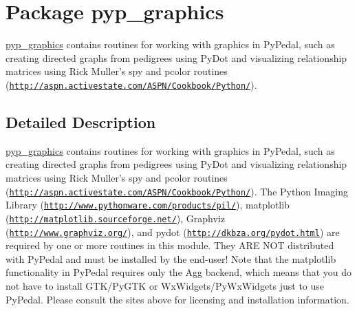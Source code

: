 \hypertarget{namespacepyp__graphics}{
\section{Package pyp\_\-graphics}
\label{namespacepyp__graphics}
}


\hyperlink{namespacepyp__graphics}{pyp\_\-graphics} contains routines for working with graphics in PyPedal, such as creating directed graphs from pedigrees using PyDot and visualizing relationship matrices using Rick Muller's spy and pcolor routines (\href{http://aspn.activestate.com/ASPN/Cookbook/Python/}{\tt http://aspn.activestate.com/ASPN/Cookbook/Python/}).  




\subsection{Detailed Description}
\hyperlink{namespacepyp__graphics}{pyp\_\-graphics} contains routines for working with graphics in PyPedal, such as creating directed graphs from pedigrees using PyDot and visualizing relationship matrices using Rick Muller's spy and pcolor routines (\href{http://aspn.activestate.com/ASPN/Cookbook/Python/}{\tt http://aspn.activestate.com/ASPN/Cookbook/Python/}). The Python Imaging Library (\href{http://www.pythonware.com/products/pil/}{\tt http://www.pythonware.com/products/pil/}), matplotlib (\href{http://matplotlib.sourceforge.net/}{\tt http://matplotlib.sourceforge.net/}), Graphviz (\href{http://www.graphviz.org/}{\tt http://www.graphviz.org/}), and pydot (\href{http://dkbza.org/pydot.html}{\tt http://dkbza.org/pydot.html}) are required by one or more routines in this module. They ARE NOT distributed with PyPedal and must be installed by the end-\/user! Note that the matplotlib functionality in PyPedal requires only the Agg backend, which means that you do not have to install GTK/PyGTK or WxWidgets/PyWxWidgets just to use PyPedal. Please consult the sites above for licensing and installation information. 